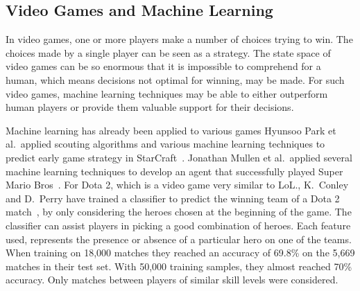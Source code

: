 \FloatBarrier
\subsection{Video Games and Machine Learning}\label{sec:mlandonlinevideogames}
In video games, one or more players make a number of choices trying to win. The choices made by a single player can be seen as a strategy.
The state space of video games can be so enormous that it is impossible to comprehend for a human, which means decisions not optimal for winning, may be made.
For such video games, machine learning techniques may be able to either outperform human players or provide them valuable support for their decisions.

Machine learning has already been applied to various games Hyunsoo Park et al.\ applied scouting algorithms and various machine learning techniques to predict early game strategy in StarCraft~\cite{Park:2012:PES:2425296.2425298}. Jonathan Mullen et al.\ applied several machine learning techniques to develop an agent that successfully played Super Mario Bros~\cite{supermario}. 
For Dota 2, which is a video game very similar to LoL.\@, 
K.\ Conley and D.\ Perry have trained a classifier to predict the winning team of a Dota 2 match~\cite{dota2article}, by only considering the heroes chosen at the beginning of the game. The classifier can assist players in picking a good combination of heroes.
Each feature used, represents the presence or absence of a particular hero on one of the teams.
When training on 18,000 matches they reached an accuracy of 69.8\% on the 5,669 matches in their test set.
With 50,000 training samples, they almost reached 70\% accuracy. Only matches between players of similar skill levels were considered.

%
%



